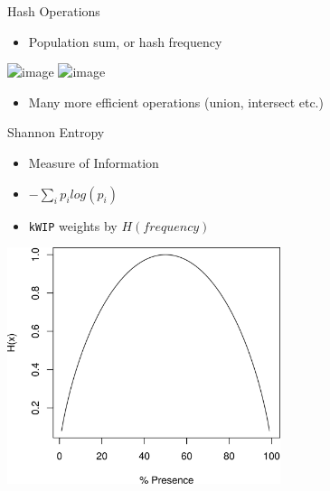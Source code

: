 \documentclass[t]{beamer}
\begin{document}
\begin{frame}{Hash Operations}
  \begin{itemize}
    \item Population sum, or hash frequency
  \end{itemize}
  \begin{center}
    \includegraphics<1>[width=0.6\textwidth]{img/hash-sums.png}
    \includegraphics<2>[width=0.6\textwidth]{img/hash-sumfreq.png}
  \end{center}
  \begin{itemize}
    \item<2-> Many more efficient operations \small{(union, intersect etc.)}
  \end{itemize}
\end{frame}

\begin{frame}{Shannon Entropy}
  \begin{itemize}
    \item Measure of Information
    \item $ -\sum\limits_{i} p_i log(p_i) $
    \item \texttt{kWIP} weights by $H(frequency)$
  \end{itemize}
  \begin{center}
    \includegraphics[width=0.6\textwidth]{img/shanent.png}
  \end{center}
\end{frame}
\end{document}
